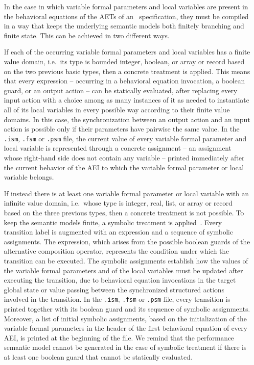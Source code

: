 In the case in which variable formal parameters and local variables are present in the behavioral equations
of the AETs of an \aemilia\ specification, they must be compiled in a way that keeps the underlying semantic
models both finitely branching and finite state. This can be achieved in two different ways.

If each of the occurring variable formal parameters and local variables has a finite value domain, i.e.\ its
type is bounded integer, boolean, or array or record based on the two previous basic types, then a concrete
treatment is applied. This means that every expression -- occurring in a behavioral equation invocation, a
boolean guard, or an output action -- can be statically evaluated, after replacing every input action with a
choice among as many instances of it as needed to instantiate all of its local variables in every possible
way according to their finite value domains. In this case, the synchronization between an output action and
an input action is possible only if their parameters have pairwise the same value. In the {\tt .ism},
{\tt .fsm} or {\tt .psm} file, the current value of every variable formal parameter and local variable is
represented through a concrete assignment -- an assignment whose right-hand side does not contain any
variable -- printed immediately after the current behavior of the AEI to which the variable formal parameter
or local variable belongs.

If instead there is at least one variable formal parameter or local variable with an infinite value domain,
i.e.\ whose type is integer, real, list, or array or record based on the three previous types, then a
concrete treatment is not possible. To keep the semantic models finite, a symbolic treatment is
applied~\cite{Ber2}. Every transition label is augmented with an expression and a sequence of symbolic
assignments. The expression, which arises from the possible boolean guards of the alternative composition
operator, represents the condition under which the transition can be executed. The symbolic assignments
establish how the values of the variable formal parameters and of the local variables must be updated after
executing the transition, due to behavioral equation invocations in the target global state or value passing
between the synchronized structured actions involved in the transition. In the {\tt .ism}, {\tt .fsm} or
{\tt .psm} file, every transition is printed together with its boolean guard and its sequence of symbolic
assignments. Moreover, a list of initial symbolic assignments, based on the initialization of the variable
formal parameters in the header of the first behavioral equation of every AEI, is printed at the beginning
of the file. We remind that the performance semantic model cannot be generated in the case of symbolic
treatment if there is at least one boolean guard that cannot be statically evaluated.


